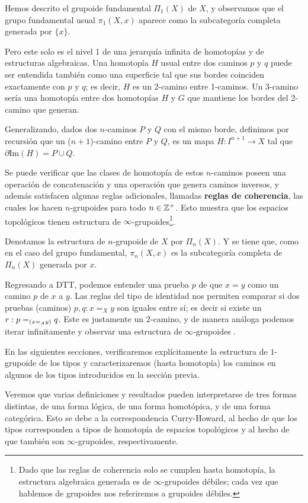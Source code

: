 \documentclass[../main.tex]{subfiles}
\begin{document}
Hemos descrito el grupoide fundamental $\Pi_1(X)$ de $X$, y observamos que el grupo fundamental usual $\pi_1(X,x)$ aparece como la subcategor\'ia completa generada por $\{x\}$.

Pero este solo es el nivel 1 de una jerarquía infinita de homotop\'ias y de estructuras algebraicas.
Una homotop\'ia $H$ usual entre dos caminos $p$ y $q$ puede ser entendida también como una superficie tal que sus bordes coinciden exactamente con $p$ y $q$; es decir, $H$ es un 2-camino entre 1-caminos. Un 3-camino ser\'ia una homotop\'ia entre dos homotop\'ias $H$ y $G$ que mantiene los bordes del 2-camino que generan.

Generalizando, dados dos $n$-caminos $P$ y $Q$ con el mismo borde, definimos por recursi\'on que un ($n+1$)-camino entre $P$ y $Q$, es un mapa $H:I^{n+1}\to X$ tal que $\partial \text{Im}(H)=P \cup Q$.

Se puede verificar que las clases de homotop\'ia de estos $n$-caminos poseen una operación de concatenaci\'on y una operaci\'on que genera caminos inversos, y adem\'as satisfacen algunas reglas adicionales, llamadas \textbf{reglas de coherencia}, las cuales los hacen $n$-grupoides para todo $n \in \Z^+$.
Esto muestra que los espacios topol\'ogicos tienen estructura de $\infty$-grupoides\footnote{Dado que las reglas de coherencia solo se cumplen hasta homotop\'ia, la estructura algebraica generada es de $\infty$-grupoides d\'ebiles; cada vez que hablemos de grupoides nos referiremos a grupoides d\'ebiles.}.

Denotamos la estructura de $n$-grupoide de $X$ por $\Pi_n(X)$.
Y se tiene que, como en el caso del grupo fundamental, $\pi_n(X,x)$ es la subcategor\'ia completa de $\Pi_n(X)$ generada por $x$.

Regresando a DTT, podemos entender una prueba $p$ de que $x=y$ como un camino $p$ de $x$ a $y$.
Las reglas del tipo de identidad nos permiten comparar si dos pruebas (caminos) $p,q:x=_X y$ son iguales entre s\'i; es decir si existe un $r : \id[{(\id[A]{x}{y})}]{p}{q}$. Este es justamente un 2-camino, y de manera an\'aloga podemos iterar infinitamente y observar una estructura de $\infty$-grupoides \cite{curien_weak_2009} \cite{van_den_berg_types_2011}.

En las siguientes secciones, verificaremos expl\'icitamente la estructura de $1$-grupoide de los tipos y caracterizaremos (hasta homotop\'ia) los caminos en algunos de los tipos introducidos en la secci\'on previa.

Veremos que varias definiciones y resultados pueden interpretarse de tres formas distintas, de una forma l\'ogica, de una forma homot\'opica, y de una forma categ\'orica.
Esto se debe a la correspondencia Curry-Howard, al hecho de que los tipos corresponden a tipos de homotop\'ia de espacios topológicos y al hecho de que también son $\infty$-grupoides, respectivamente.
\end{document}
